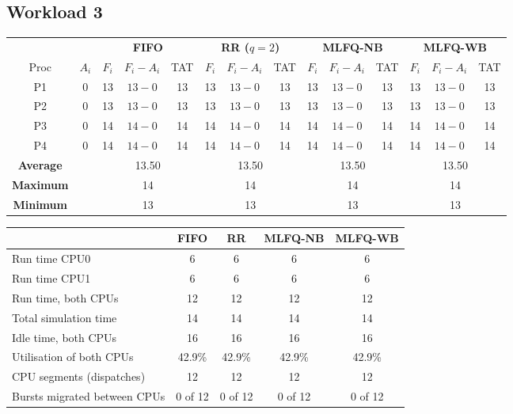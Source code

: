 \documentclass[11pt,a4paper]{article}
\begin{document}
\subsection{Workload 3}
\begin{center}\footnotesize\setlength{\tabcolsep}{4pt}
\begin{tabular}{cccccccccccccc}\toprule
& & \multicolumn{3}{c}{\textbf{FIFO}} & \multicolumn{3}{c}{\textbf{RR ($q=2$)}} & \multicolumn{3}{c}{\textbf{MLFQ-NB}} & \multicolumn{3}{c}{\textbf{MLFQ-WB}} \\
\cmidrule(lr){3-5}\cmidrule(lr){6-8}\cmidrule(lr){9-11}\cmidrule(lr){12-14}
Proc & $A_i$ & $F_i$ & $F_i-A_i$ & TAT & $F_i$ & $F_i-A_i$ & TAT & $F_i$ & $F_i-A_i$ & TAT & $F_i$ & $F_i-A_i$ & TAT \\\midrule
P1 & 0 & 13 & $13-0$ & 13 & 13 & $13-0$ & 13 & 13 & $13-0$ & 13 & 13 & $13-0$ & 13 \\
P2 & 0 & 13 & $13-0$ & 13 & 13 & $13-0$ & 13 & 13 & $13-0$ & 13 & 13 & $13-0$ & 13 \\
P3 & 0 & 14 & $14-0$ & 14 & 14 & $14-0$ & 14 & 14 & $14-0$ & 14 & 14 & $14-0$ & 14 \\
P4 & 0 & 14 & $14-0$ & 14 & 14 & $14-0$ & 14 & 14 & $14-0$ & 14 & 14 & $14-0$ & 14 \\
\midrule
\textbf{Average} & & \multicolumn{3}{c}{13.50} & \multicolumn{3}{c}{13.50} & \multicolumn{3}{c}{13.50} & \multicolumn{3}{c}{13.50} \\
\textbf{Maximum} & & \multicolumn{3}{c}{14} & \multicolumn{3}{c}{14} & \multicolumn{3}{c}{14} & \multicolumn{3}{c}{14} \\
\textbf{Minimum} & & \multicolumn{3}{c}{13} & \multicolumn{3}{c}{13} & \multicolumn{3}{c}{13} & \multicolumn{3}{c}{13} \\
\bottomrule\end{tabular}\end{center}
\begin{center}\footnotesize\begin{tabular}{lcccc}\toprule
& \textbf{FIFO} & \textbf{RR} & \textbf{MLFQ-NB} & \textbf{MLFQ-WB}\\\midrule
Run time CPU0 & 6 & 6 & 6 & 6 \\
Run time CPU1 & 6 & 6 & 6 & 6 \\
Run time, both CPUs & 12 & 12 & 12 & 12 \\
Total simulation time & 14 & 14 & 14 & 14 \\
Idle time, both CPUs & 16 & 16 & 16 & 16 \\
Utilisation of both CPUs & 42.9\% & 42.9\% & 42.9\% & 42.9\% \\
CPU segments (dispatches) & 12 & 12 & 12 & 12 \\
Bursts migrated between CPUs & 0 of 12 & 0 of 12 & 0 of 12 & 0 of 12 \\
\bottomrule\end{tabular}\end{center}
\end{document}
